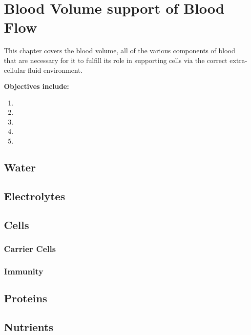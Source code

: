 \chapter{Blood Volume support of Blood Flow}\label{chp:blood_content}

\minitoc
This chapter covers the blood volume, all of the various components of blood that are necessary for it to fulfill its role in supporting cells via the correct extra-cellular fluid environment.

\vspace{5mm}

\textbf{Objectives include:}
\begin{enumerate}
    \item
    \item
    \item
    \item
    \item
\end{enumerate}

\section{Water}

\section{Electrolytes}

\section{Cells}
\subsection{Carrier Cells}
\subsection{Immunity}

\section{Proteins}

\section{Nutrients}


\printbibliography[heading=subbibintoc]